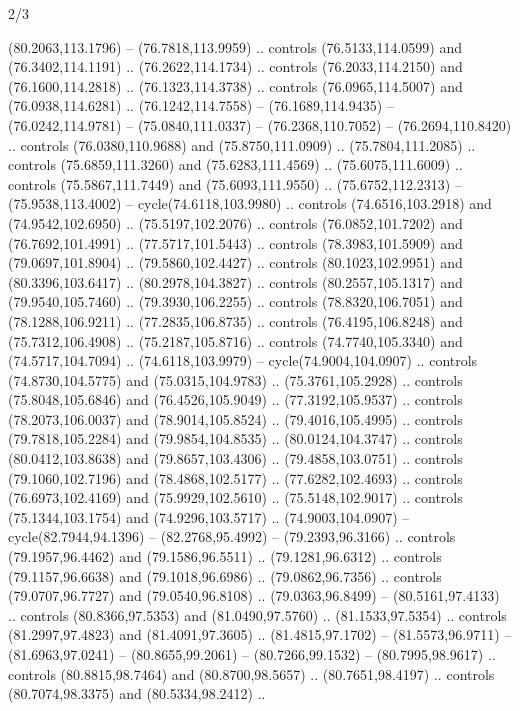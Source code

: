 \begin{flagdescription}{2/3}
\begin{scope}[scale=0.00214\flagwidth,yshift=164.5mm]
\begin{scope}[y=-0.8pt, x=0.8pt, inner sep=0pt, outer sep=0pt]
\begin{scope}[fill=black]
  (80.2063,113.1796) -- (76.7818,113.9959) .. controls (76.5133,114.0599) and
  (76.3402,114.1191) .. (76.2622,114.1734) .. controls (76.2033,114.2150) and
  (76.1600,114.2818) .. (76.1323,114.3738) .. controls (76.0965,114.5007) and
  (76.0938,114.6281) .. (76.1242,114.7558) -- (76.1689,114.9435) --
  (76.0242,114.9781) -- (75.0840,111.0337) -- (76.2368,110.7052) --
  (76.2694,110.8420) .. controls (76.0380,110.9688) and (75.8750,111.0909) ..
  (75.7804,111.2085) .. controls (75.6859,111.3260) and (75.6283,111.4569) ..
  (75.6075,111.6009) .. controls (75.5867,111.7449) and (75.6093,111.9550) ..
  (75.6752,112.2313) -- (75.9538,113.4002) -- cycle(74.6118,103.9980) ..
  controls (74.6516,103.2918) and (74.9542,102.6950) .. (75.5197,102.2076) ..
  controls (76.0852,101.7202) and (76.7692,101.4991) .. (77.5717,101.5443) ..
  controls (78.3983,101.5909) and (79.0697,101.8904) .. (79.5860,102.4427) ..
  controls (80.1023,102.9951) and (80.3396,103.6417) .. (80.2978,104.3827) ..
  controls (80.2557,105.1317) and (79.9540,105.7460) .. (79.3930,106.2255) ..
  controls (78.8320,106.7051) and (78.1288,106.9211) .. (77.2835,106.8735) ..
  controls (76.4195,106.8248) and (75.7312,106.4908) .. (75.2187,105.8716) ..
  controls (74.7740,105.3340) and (74.5717,104.7094) .. (74.6118,103.9979) --
  cycle(74.9004,104.0907) .. controls (74.8730,104.5775) and (75.0315,104.9783)
  .. (75.3761,105.2928) .. controls (75.8048,105.6846) and (76.4526,105.9049) ..
  (77.3192,105.9537) .. controls (78.2073,106.0037) and (78.9014,105.8524) ..
  (79.4016,105.4995) .. controls (79.7818,105.2284) and (79.9854,104.8535) ..
  (80.0124,104.3747) .. controls (80.0412,103.8638) and (79.8657,103.4306) ..
  (79.4858,103.0751) .. controls (79.1060,102.7196) and (78.4868,102.5177) ..
  (77.6282,102.4693) .. controls (76.6973,102.4169) and (75.9929,102.5610) ..
  (75.5148,102.9017) .. controls (75.1344,103.1754) and (74.9296,103.5717) ..
  (74.9003,104.0907) -- cycle(82.7944,94.1396) -- (82.2768,95.4992) --
  (79.2393,96.3166) .. controls (79.1957,96.4462) and (79.1586,96.5511) ..
  (79.1281,96.6312) .. controls (79.1157,96.6638) and (79.1018,96.6986) ..
  (79.0862,96.7356) .. controls (79.0707,96.7727) and (79.0540,96.8108) ..
  (79.0363,96.8499) -- (80.5161,97.4133) .. controls (80.8366,97.5353) and
  (81.0490,97.5760) .. (81.1533,97.5354) .. controls (81.2997,97.4823) and
  (81.4091,97.3605) .. (81.4815,97.1702) -- (81.5573,96.9711) --
  (81.6963,97.0241) -- (80.8655,99.2061) -- (80.7266,99.1532) --
  (80.7995,98.9617) .. controls (80.8815,98.7464) and (80.8700,98.5657) ..
  (80.7651,98.4197) .. controls (80.7074,98.3375) and (80.5334,98.2412) ..

\end{scope}
\end{scope}
\end{scope}
\end{flagdescription}
